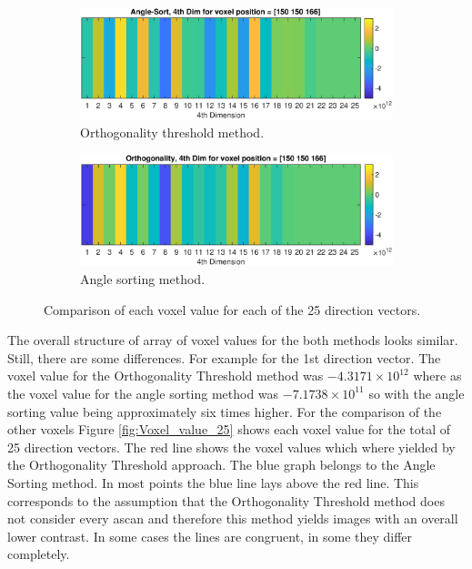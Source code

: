 \begin{figure}[H]
     \centering
     \begin{subfigure}[b]{0.85\textwidth}
         \centering
        \includegraphics[width=1.12\linewidth,right]{Graphics/Results/Diff_angle_sort_orthogonality/diff_ortho_bubble_25dim_150150150_ortho.eps}
         \caption{Orthogonality threshold method.}
         \label{fig:res:25_voxel_values_diff_bubble_ortho_image_ortho}
     \end{subfigure}
     \hfill
     \begin{subfigure}[b]{0.85\textwidth}
         \centering
         \includegraphics[width=1.12\textwidth,right]{Graphics/Results/Diff_angle_sort_orthogonality/diff_ortho_bubble_25dim_150150150_sort.eps}
         \caption{Angle sorting method.}
         \label{fig:res:25_voxel_values_diff_bubble_ortho_image_bubble}
     \end{subfigure}
        \caption{Comparison of each voxel value for each of the 25 direction vectors.}
        \label{fig:res:25_voxel_values_diff_bubble_ortho_image}
\end{figure}

The overall structure of array of voxel values for the both methods looks similar. Still, there are some differences. For example for the 1st direction vector. The voxel value for the Orthogonality Threshold method was $-4.3171 \times 10^{12}$  where as the voxel value for the angle sorting method was $-7.1738\times10^{11}$ so with the angle sorting value being approximately six times higher. For the comparison of the other voxels Figure \ref{fig:Voxel_value_25} shows each voxel value for the total of 25 direction vectors. The red line shows the voxel values which where yielded by the Orthogonality Threshold approach. The blue graph belongs to the Angle Sorting method. In most points the blue line lays above the red line. This corresponds to the assumption that the Orthogonality Threshold method does not consider every \ac{ascan} and therefore this method yields images with an overall lower contrast. In some cases the lines are congruent, in some they differ completely.  





